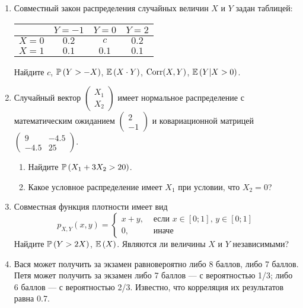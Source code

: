\begin{enumerate}
\item Совместный закон распределения случайных величин  $X$  и  $Y$
задан таблицей:

\begin{tabular}{@{}cccc@{}}
\toprule
    & $Y=-1$ & $Y=0$ & $Y=2$ \\ \midrule
$X=0$ & $0.2$  & $c$   & $0.2$ \\
$X=1$ & $0.1$  & $0.1$ & $0.1$ \\ \bottomrule
\end{tabular}

Найдите  $c$,  $\P\left(Y>-X\right)$,  $\E\left(X\cdot Y \right)$, $\Corr(X,Y)$, $\E\left(Y|X>0\right)$.

\item Случайный вектор  $\left(\begin{array}{c}
{X_{1} } \\ {X_{2} }
\end{array}\right)$  имеет нормальное распределение с
математическим ожиданием  $\left(\begin{array}{c} {2} \\ {-1}
\end{array}\right)$  и ковариационной матрицей
$\left(\begin{array}{cc} {9} & {-4.5} \\ {-4.5} & {25}
\end{array}\right)$.
\begin{enumerate}
\item Найдите  $\P\left(X_{1} +3X_{2} >20\right)$.
\item Какое условное распределение имеет $X_{1}$ при условии, что $X_{2}=0$?
\end{enumerate}

\item Совместная функция плотности имеет вид
\[
p_{X,Y} \left(x,y\right)=
\begin{cases}
x+y, & \text{ если } x\in \left[0;1\right],\, y\in \left[0;1\right] \\
0, & \text{ иначе}
\end{cases}
\]
Найдите  $\P\left(Y>2X\right)$, $\E\left(X\right)$. Являются ли величины $X$ и $Y$ независимыми?

\item Вася может получить за экзамен равновероятно либо 8 баллов, либо 7 баллов. Петя может получить за экзамен либо 7 баллов — с вероятностью 1/3; либо 6 баллов — с вероятностью 2/3. Известно, что корреляция их результатов равна 0.7.


\end{enumerate}
